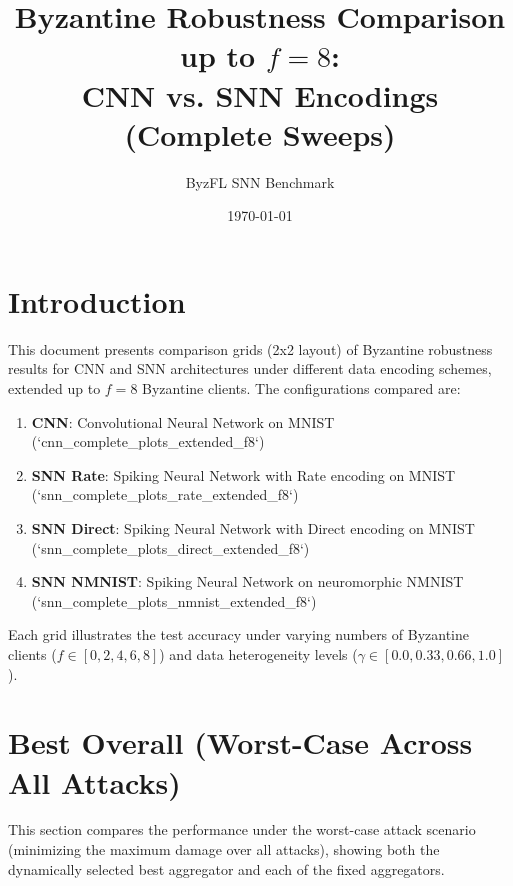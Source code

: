 \documentclass{article}
\title{Byzantine Robustness Comparison up to $f=8$:\\CNN vs. SNN Encodings (Complete Sweeps)}
\author{ByzFL SNN Benchmark}
\date{\today}
\begin{document}
\maketitle

\tableofcontents
\newpage

\section{Introduction}
This document presents comparison grids (2x2 layout) of Byzantine robustness results for CNN and SNN architectures under different data encoding schemes, extended up to $f=8$ Byzantine clients. The configurations compared are:
\begin{enumerate}
    \item \textbf{CNN}: Convolutional Neural Network on MNIST (`cnn\_complete\_plots\_extended\_f8`)
    \item \textbf{SNN Rate}: Spiking Neural Network with Rate encoding on MNIST (`snn\_complete\_plots\_rate\_extended\_f8`)
    \item \textbf{SNN Direct}: Spiking Neural Network with Direct encoding on MNIST (`snn\_complete\_plots\_direct\_extended\_f8`)
    \item \textbf{SNN NMNIST}: Spiking Neural Network on neuromorphic NMNIST (`snn\_complete\_plots\_nmnist\_extended\_f8`)
\end{enumerate}

Each grid illustrates the test accuracy under varying numbers of Byzantine clients ($f \in [0, 2, 4, 6, 8]$) and data heterogeneity levels ($\gamma \in [0.0, 0.33, 0.66, 1.0]$).

\newpage

\section{Best Overall (Worst-Case Across All Attacks)}
\label{sec:best_overall}
This section compares the performance under the worst-case attack scenario (minimizing the maximum damage over all attacks), showing both the dynamically selected best aggregator and each of the fixed aggregators.
\end{document}
